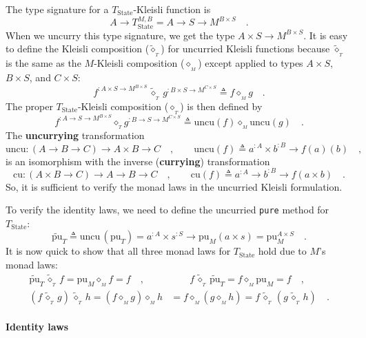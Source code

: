 The type signature for a $T_{\text{State}}$-Kleisli function is 
\[
A\rightarrow T_{\text{State}}^{M,B}=A\rightarrow S\rightarrow M^{B\times S}\quad.
\]
When we uncurry this type signature, we get the type $A\times S\rightarrow M^{B\times S}$.
It is easy to define the Kleisli composition ($\tilde{\diamond}_{_{T}}$)
for uncurried Kleisli functions because $\tilde{\diamond}_{_{T}}$
is the same as the $M$-Kleisli composition ($\diamond_{_{M}}$) except
applied to types $A\times S$, $B\times S$, and $C\times S$:
\[
f^{:A\times S\rightarrow M^{B\times S}}\,\tilde{\diamond}_{_{T}}\,g^{:B\times S\rightarrow M^{C\times S}}\triangleq f\diamond_{_{M}}g\quad.
\]
The proper $T_{\text{State}}$-Kleisli composition ($\diamond_{_{T}}$)
is then defined by
\[
f^{:A\rightarrow S\rightarrow M^{B\times S}}\diamond_{_{T}}g^{:B\rightarrow S\rightarrow M^{C\times S}}\triangleq\text{uncu}\left(f\right)\diamond_{_{M}}\text{uncu}\left(g\right)\quad.
\]
The \textbf{uncurrying} transformation 
\[
\text{uncu}:\left(A\rightarrow B\rightarrow C\right)\rightarrow A\times B\rightarrow C\quad,\quad\quad\text{uncu}\left(f\right)\triangleq a^{:A}\times b^{:B}\rightarrow f(a)(b)\quad,
\]
is an isomorphism with the inverse (\textbf{currying})
transformation
\[
\text{cu}:\left(A\times B\rightarrow C\right)\rightarrow A\rightarrow B\rightarrow C\quad,\quad\quad\text{cu}\left(f\right)\triangleq a^{:A}\rightarrow b^{:B}\rightarrow f(a\times b)\quad.
\]
So, it is sufficient to verify the monad laws in the uncurried Kleisli
formulation. 

To verify the identity laws, we need to define the uncurried \lstinline!pure!
method for $T_{\text{State}}$:
\[
\tilde{\text{pu}}_{T}\triangleq\text{uncu}\,(\text{pu}_{T})=a^{:A}\times s^{:S}\rightarrow\text{pu}_{M}(a\times s)=\text{pu}_{M}^{A\times S}\quad.
\]
It is now quick to show that all three monad laws for $T_{\text{State}}$
hold due to $M$\textsf{'}s monad laws:
\begin{align*}
\tilde{\text{pu}}_{T}\,\tilde{\diamond}_{_{T}}\,f=\text{pu}_{M}\diamond_{_{M}}f=f\quad, & \quad\quad f\,\tilde{\diamond}_{_{T}}\,\tilde{\text{pu}}_{T}=f\diamond_{_{M}}\text{pu}_{M}=f\quad,\\
(f\,\tilde{\diamond}_{_{T}}\,g)\,\tilde{\diamond}_{_{T}}\,h=(f\diamond_{_{M}}g)\diamond_{_{M}}h & =f\diamond_{_{M}}(g\diamond_{_{M}}h)=f\,\tilde{\diamond}_{_{T}}\,(g\,\tilde{\diamond}_{_{T}}\,h)\quad.
\end{align*}


\paragraph{Identity laws}

